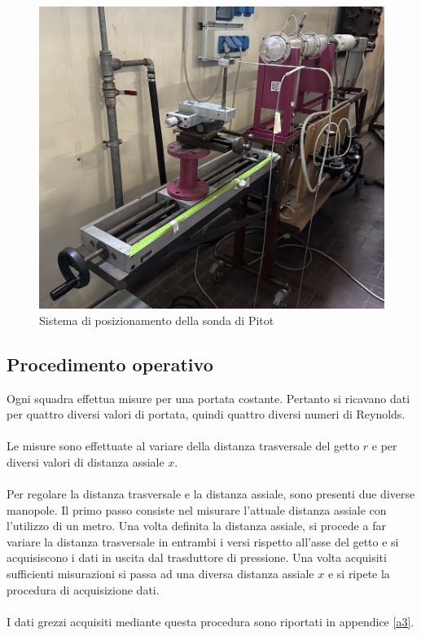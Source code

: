 \begin{figure}[ht]
    \centering
    \includegraphics[width=.85\textwidth]{images/3/gettomanopole.jpg}
    \caption{Sistema di posizionamento della sonda di Pitot}
\end{figure}

\subsection{Procedimento operativo}
Ogni squadra effettua misure per una portata costante. Pertanto si ricavano dati per quattro diversi valori di portata, quindi quattro diversi numeri di Reynolds.\\\\
Le misure sono effettuate al variare della distanza trasversale del getto $r$ e per diversi valori di distanza assiale $x$.\\\\
Per regolare la distanza trasversale e la distanza assiale, sono presenti due diverse manopole. Il primo passo consiste nel misurare l'attuale distanza assiale con l'utilizzo di un metro. Una volta definita la distanza assiale, si procede a far variare la distanza trasversale in entrambi i versi rispetto all'asse del getto e si acquisiscono i dati in uscita dal trasduttore di pressione. Una volta acquisiti sufficienti misurazioni si passa ad una diversa distanza assiale $x$ e si ripete la procedura di acquisizione dati.\\\\
I dati grezzi acquisiti mediante questa procedura sono riportati in appendice \ref{a3}.

